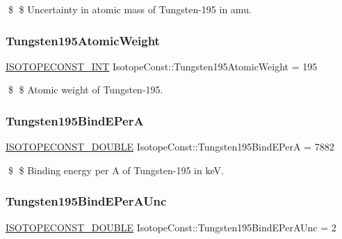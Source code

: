 \$ \$ Uncertainty in atomic mass of Tungsten-\/195 in amu. \mbox{\label{group___isotope_const-_tungsten-_w195_gaf82c847fb5a06813fc0986a87e73c285}} 
\subsubsection{\texorpdfstring{Tungsten195\+Atomic\+Weight}{Tungsten195AtomicWeight}}
{\footnotesize\ttfamily \mbox{\hyperlink{group___isotope_const-_macros_ga5f18360b3e99483a35c32d789e62621c}{I\+S\+O\+T\+O\+P\+E\+C\+O\+N\+S\+T\+\_\+\+I\+NT}} Isotope\+Const\+::\+Tungsten195\+Atomic\+Weight = 195}

\$ \$ Atomic weight of Tungsten-\/195. \mbox{\label{group___isotope_const-_tungsten-_w195_gaefdcdda37501037a01bd055dd4f310e5}} 
\subsubsection{\texorpdfstring{Tungsten195\+Bind\+E\+PerA}{Tungsten195BindEPerA}}
{\footnotesize\ttfamily \mbox{\hyperlink{group___isotope_const-_macros_ga8f45a7272ce02c0b4c65c44636ed719a}{I\+S\+O\+T\+O\+P\+E\+C\+O\+N\+S\+T\+\_\+\+D\+O\+U\+B\+LE}} Isotope\+Const\+::\+Tungsten195\+Bind\+E\+PerA = 7882}

\$ \$ Binding energy per A of Tungsten-\/195 in keV. \mbox{\label{group___isotope_const-_tungsten-_w195_ga484058073f321f9a37fbb8689ec7f1d0}} 
\subsubsection{\texorpdfstring{Tungsten195\+Bind\+E\+Per\+A\+Unc}{Tungsten195BindEPerAUnc}}
{\footnotesize\ttfamily \mbox{\hyperlink{group___isotope_const-_macros_ga8f45a7272ce02c0b4c65c44636ed719a}{I\+S\+O\+T\+O\+P\+E\+C\+O\+N\+S\+T\+\_\+\+D\+O\+U\+B\+LE}} Isotope\+Const\+::\+Tungsten195\+Bind\+E\+Per\+A\+Unc = 2}

